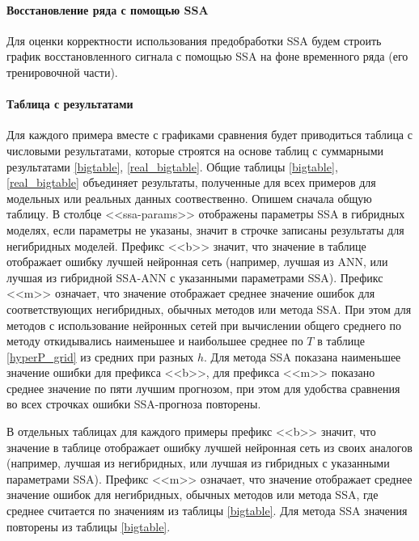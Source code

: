 \documentclass[specialist,
               substylefile = spbu.rtx,
               subf,href,colorlinks=true, 12p]{disser}
\begin{document}
\paragraph{Восстановление ряда с помощью SSA} Для оценки корректности использования предобработки SSA будем строить график восстановленного сигнала с помощью SSA на фоне временного ряда (его тренировочной части).

\paragraph{Таблица с результатами}
Для каждого примера вместе с графиками сравнения будет приводиться таблица с числовыми результатами, которые строятся на основе таблиц с суммарными результатами \ref{bigtable}, \ref{real_bigtable}. Общие таблицы \ref{bigtable}, \ref{real_bigtable} объединяет результаты, полученные для всех примеров для модельных или реальных данных соотвественно. Опишем сначала общую таблицу.
В столбце <<ssa-params>> отображены параметры SSA в гибридных моделях, если параметры не указаны, значит в строчке записаны результаты для негибридных моделей. Префикс <<b>> значит, что значение в таблице отображает ошибку лучшей нейронная сеть (например, лучшая из ANN, или лучшая из гибридной SSA-ANN с указанными параметрами SSA). Префикс <<m>> означает, что значение отображает среднее значение ошибок для соответствующих негибридных, обычных методов или метода SSA. При этом для методов с использование нейронных сетей при вычислении общего среднего по методу откидывались наименьшее и наибольшее среднее по $T$ в таблице \ref {hyperP_grid} из средних при разных $h$. Для метода SSA показана наименьшее значение ошибки для префикса <<b>>, для префикса <<m>> показано среднее значение по пяти лучшим прогнозом, при этом для удобства сравнения во всех строчках ошибки SSA-прогноза повторены.


В отдельных таблицах для каждого примеры префикс <<b>> значит, что значение в таблице отображает ошибку лучшей нейронная сеть из своих аналогов (например, лучшая из негибридных, или лучшая из гибридных с указанными параметрами SSA). Префикс <<m>> означает, что значение отображает среднее значение ошибок для негибридных, обычных методов или метода SSA, где среднее считается по значениям из таблицы \ref{bigtable}. Для метода SSA значения повторены из таблицы \ref{bigtable}.
\end{document}

